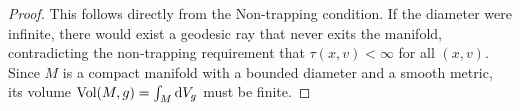 \begin{proof}
  This follows directly from the Non-trapping condition. If the diameter were infinite, there would exist a geodesic ray that never exits the manifold, contradicting the non-trapping requirement that $\tau(x, v) < \infty$ for all $(x, v)$. Since $M$ is a compact manifold with a bounded diameter and a smooth metric, its volume $\text{Vol}(M, g) = \int_M \dV_g$ must be finite.
\end{proof}
